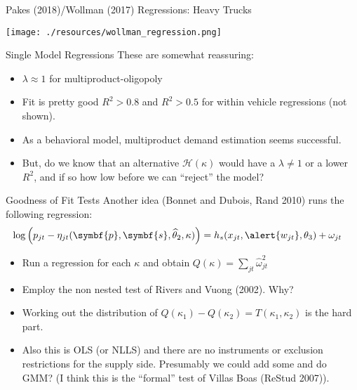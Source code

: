 \documentclass[aspectratio=169,10pt]{beamer}
\begin{document}
\begin{frame}{Pakes (2018)/Wollman (2017) Regressions: Heavy Trucks}
\begin{center}
\texttt{[image: ./resources/wollman\_regression.png]}
\end{center}
\end{frame}

\begin{frame}{Single Model Regressions}
These are somewhat reassuring:
\begin{itemize}
\item $\lambda\approx 1$ for multiproduct-oligopoly
\item Fit is pretty good $R^2 > 0.8$ and $R^2 > 0.5$ for within vehicle regressions (not shown).
\item As a behavioral model, multiproduct demand estimation seems successful.
\item But, do we know that an alternative $\mathcal{H}(\kappa)$ would have a $\lambda \neq 1$ or a lower $R^2$, and if so how low before we can ``reject'' the model?
\end{itemize}
\end{frame}

\begin{frame}{Goodness of Fit Tests}
Another idea (Bonnet and Dubois, Rand 2010) runs the following regression:
\begin{align*}
\log \left( p_{jt} - \eta_{jt}(\symbf{p},\symbf{s},\widehat{\theta}_2,\kappa) \right) &= h_s(x_{jt}, \alert{w_{jt}},\theta_3) + \omega_{jt}
\end{align*}
\begin{itemize}
\item Run a regression for each $\kappa$ and obtain $Q(\kappa)=\sum_{jt} \widehat{\omega}_{jt}^2$
\item Employ the \alert{non nested test} of Rivers and Vuong (2002). Why?
\item Working out the distribution of $Q(\kappa_1) - Q(\kappa_2)=T(\kappa_1,\kappa_2)$ is the hard part.
\item Also this is OLS (or NLLS) and there are no instruments or \alert{exclusion restrictions} for the supply side. Presumably we could add some and do GMM? (I think this is the ``formal'' test of Villas Boas (ReStud 2007)).
\end{itemize}
\end{frame}
\end{document}
